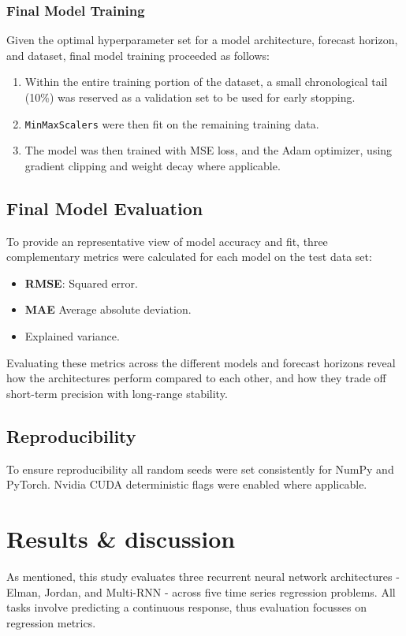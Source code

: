 \documentclass[conference]{IEEEtran}
\begin{document}
\subsubsection{\textbf{Final Model Training}}
Given the optimal hyperparameter set for a model architecture, forecast horizon, and dataset, final model training proceeded as follows:
\begin{enumerate}
    \item Within the entire training portion of the dataset, a small chronological tail (10\%) was reserved as a validation set to be used for early stopping.
    \item \texttt{MinMaxScalers} were then fit on the remaining training data.
    \item The model was then trained with MSE loss, and the Adam optimizer, using gradient clipping and weight decay where applicable.
\end{enumerate}

\subsection{\textbf{Final Model Evaluation}}
To provide an representative view of model accuracy and fit, three complementary metrics were calculated for each model on the test data set:
\begin{itemize}
    \item \textbf{RMSE}: Squared error.
    \item \textbf{MAE} Average absolute deviation.
    \item {} Explained variance.
\end{itemize}
Evaluating these metrics across the different models and forecast horizons reveal how the architectures perform compared to each other, and how they trade off short-term precision with long-range stability.

\subsection{\textbf{Reproducibility}}
To ensure reproducibility all random seeds were set consistently for NumPy and PyTorch. Nvidia CUDA deterministic flags were enabled where applicable.

\section{\textbf{Results \& discussion}}
As mentioned, this study evaluates three recurrent neural network architectures - Elman, Jordan, and Multi-RNN - across five time series regression problems. All tasks involve predicting a continuous response, thus evaluation focusses on regression metrics.
\end{document}
